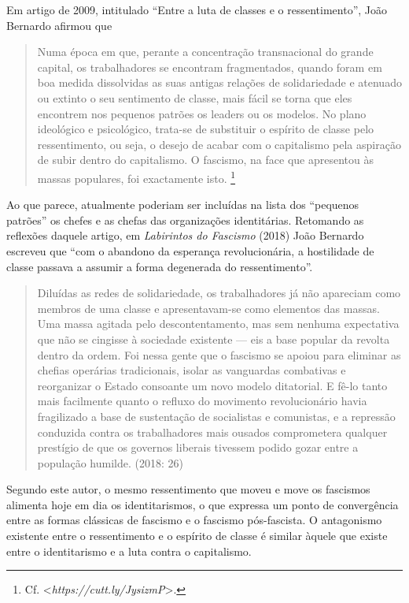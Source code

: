 Em artigo de 2009, intitulado ``Entre a luta de classes e o
ressentimento'', João Bernardo afirmou que

\begin{quote}
Numa época em que, perante a concentração transnacional do grande
capital, os trabalhadores se encontram fragmentados, quando foram em boa
medida dissolvidas as suas antigas relações de solidariedade e atenuado
ou extinto o seu sentimento de classe, mais fácil se torna que eles
encontrem nos pequenos patrões os leaders ou os modelos. No plano
ideológico e psicológico, trata-se de substituir o espírito de classe
pelo ressentimento, ou seja, o desejo de acabar com o capitalismo pela
aspiração de subir dentro do capitalismo. O fascismo, na face que
apresentou às massas populares, foi exactamente isto. \footnote{Cf.
  \textless{}\emph{https://cutt.ly/JysizmP}\textgreater{}.}
\end{quote}

Ao que parece, atualmente poderiam ser incluídas na lista dos ``pequenos
patrões'' os chefes e as chefas das organizações identitárias. Retomando
as reflexões daquele artigo, em \emph{Labirintos do Fascismo} (2018)
João Bernardo escreveu que ``com o abandono da esperança revolucionária,
a hostilidade de classe passava a assumir a forma degenerada do
ressentimento''.

\begin{quote}
Diluídas as redes de solidariedade, os trabalhadores já não apareciam
como membros de uma classe e apresentavam-se como elementos das massas.
Uma massa agitada pelo descontentamento, mas sem nenhuma expectativa que
não se cingisse à sociedade existente --- eis a base popular da revolta
dentro da ordem. Foi nessa gente que o fascismo se apoiou para eliminar
as chefias operárias tradicionais, isolar as vanguardas combativas e
reorganizar o Estado consoante um novo modelo ditatorial. E fê-lo tanto
mais facilmente quanto o refluxo do movimento revolucionário havia
fragilizado a base de sustentação de socialistas e comunistas, e a
repressão conduzida contra os trabalhadores mais ousados comprometera
qualquer prestígio de que os governos liberais tivessem podido gozar
entre a população humilde. (2018: 26)
\end{quote}

Segundo este autor, o mesmo ressentimento que moveu e move os fascismos
alimenta hoje em dia os identitarismos, o que expressa um ponto de
convergência entre as formas clássicas de fascismo e o fascismo
pós-fascista. O antagonismo existente entre o ressentimento e o espírito
de classe é similar àquele que existe entre o identitarismo e a luta
contra o capitalismo.

